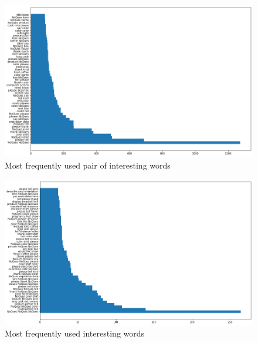 \documentclass[sigconf]{acmart}
\begin{document}
\begin{figure}[bp]
        \centering
        \includegraphics[scale=0.45]{project/images/bigram_interesting.png}  
        \caption{Most frequently used pair of interesting words} 
          \label{fig:bi_int}   
\end{figure}
\begin{figure}[bp]
        \centering
        \includegraphics[scale=0.5]{project/images/trigram_interesting.png}  
        \caption{Most frequently used interesting words} 
          \label{fig:tri_int}   
\end{figure}




\end{document}
